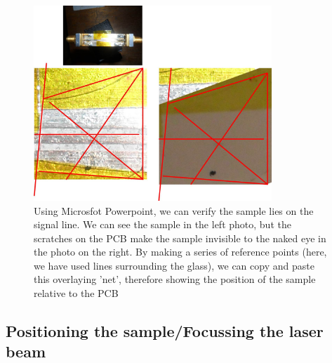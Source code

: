 \documentclass[14pt,a4paper] {article}
\begin{document}
\begin{figure}[pH]
\includegraphics[width=0.8\textwidth]{PCB-Signal-line-Sample-Verification.jpg}

\caption{Using Microsfot Powerpoint, we can verify the sample lies on the signal line. We can see the sample in the left photo, but the scratches on the PCB make the sample invisible to the naked eye in the photo on the right. By making a series of reference points (here, we have used lines surrounding the glass), we can copy and paste this overlaying 'net', therefore showing the position of the sample relative to the PCB}
\label{fig:fixSample}
\end{figure}

\newpage

\subsection{Positioning the sample/Focussing the laser beam}
\end{document}
